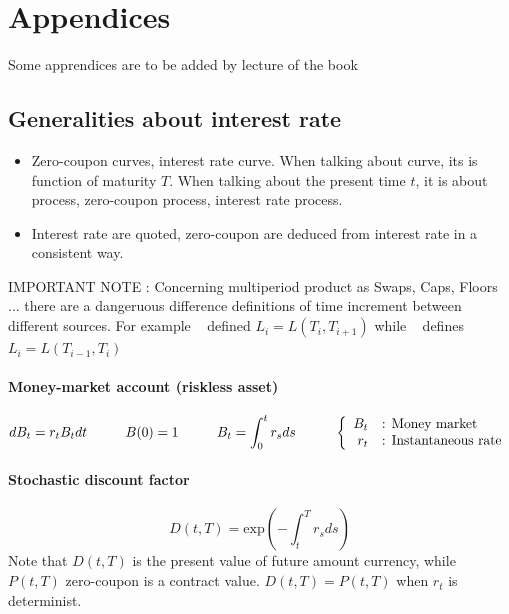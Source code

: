 \documentclass[a4paper,10pt]{article}
\newcommand{\Bt}{B_t}
\newcommand{\PtT}{P(t,T)}
\newcommand{\inttT}{\int_t^T}
\newcommand{\intt}{\int_0^t}
\newcommand{\FuncExp}{\text{exp}}
\begin{document}
\newpage
\section{Appendices}
\appendix
Some apprendices are to be added by lecture of the book ~\cite{BRIGO2006}
\subsection{Generalities about interest rate}
\begin{itemize}
 \item Zero-coupon curves, interest rate curve. When talking about curve, its is function of maturity $T$. When talking about the present time $t$, it is about process, zero-coupon process, interest rate process.
 \item Interest rate are quoted, zero-coupon are deduced from interest rate in a consistent way.
\end{itemize}
{\color{red}IMPORTANT NOTE : Concerning multiperiod product as Swaps, Caps, Floors ... there are a dangeruous difference definitions of time increment between different sources. For example ~\cite{THAI2013} defined $L_i=L(T_i,T_{i+1})$ while ~\cite{BRIGO2006} defines $L_i=L(T_{i-1},T_i)$}
\paragraph{Money-market account (riskless asset)}
\[
d\Bt=r_t \Bt dt \hspace{1cm} B(0)=1 \hspace{1cm} B_t = \intt r_s ds
\hspace{1cm}
\left\{
\begin{array}{r l}
\Bt &\text{: Money market} \\
r_t &\text{: Instantaneous rate} 
\end{array}
\right.
\]
\paragraph{Stochastic discount factor} 
\[
D(t,T) = \FuncExp\left( -\inttT r_s ds \right)
\]
Note that $D(t,T)$ is the present value of future amount currency, while $\PtT$ zero-coupon is a contract value. $D(t,T)=\PtT$ when $r_t$ is determinist.
\end{document}
